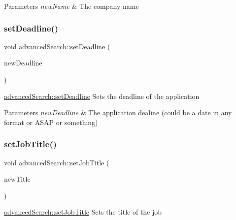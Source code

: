 \begin{DoxyParams}{Parameters}
{\em new\+Name} & The company name \\
\hline
\end{DoxyParams}
\mbox{\label{classadvanced_search_aeaacf5b995f4169c38d4381e17bc0969}} 
\subsubsection{\texorpdfstring{set\+Deadline()}{setDeadline()}}
{\footnotesize\ttfamily void advanced\+Search\+::set\+Deadline (\begin{DoxyParamCaption}\item[{Q\+String}]{new\+Deadline }\end{DoxyParamCaption})}



\mbox{\hyperlink{classadvanced_search_aeaacf5b995f4169c38d4381e17bc0969}{advanced\+Search\+::set\+Deadline}} Sets the deadline of the application 


\begin{DoxyParams}{Parameters}
{\em new\+Deadline} & The application dealine (could be a date in any format or \textquotesingle{}A\+S\+AP\textquotesingle{} or something) \\
\hline
\end{DoxyParams}
\mbox{\label{classadvanced_search_a698024f20a64fd27b1b352bce5c6f527}} 
\subsubsection{\texorpdfstring{set\+Job\+Title()}{setJobTitle()}}
{\footnotesize\ttfamily void advanced\+Search\+::set\+Job\+Title (\begin{DoxyParamCaption}\item[{Q\+String}]{new\+Title }\end{DoxyParamCaption})}



\mbox{\hyperlink{classadvanced_search_a698024f20a64fd27b1b352bce5c6f527}{advanced\+Search\+::set\+Job\+Title}} Sets the title of the job 


